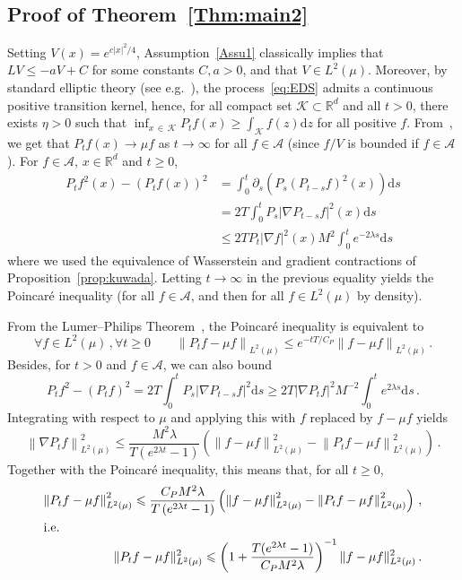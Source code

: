\documentclass[10pt]{amsart}
\theoremstyle{definition}\newtheorem{defi}[theo]{Definition}\newtheorem{rema}[theo]{Remark}\newtheorem{exam}[theo]{Example}\newtheorem{exem}[theo]{Example}\newtheorem{nota}[theo]{Notation}
\newcommand{\R}{\mathbb R}
\newcommand{\A}{\mathcal A}
\newcommand{\clK}{\mathcal K}
\newcommand{\dd}{\mathrm{d}}
\newcommand{\na}{\nabla}
\newcommand{\1}{\mathbbm{1}}
\newcommand{\nv}[1]{#1}
\let\oldforall\forall
\renewcommand*{\forall}{\mathrel{\oldforall}}
\begin{document}
\subsection{Proof of Theorem~\ref{Thm:main2}}\label{sec:preuveL2}
Setting $V(x) = e^{c|x|^2/4}$, Assumption~\ref{Assu1} classically implies that $LV\leqslant -aV + C$ for some constants $C,a>0$, and that $V\in L^2 (\mu)$. Moreover, by standard elliptic theory (see e.g.~\cite[Theorem~0.5 and Condition 0.24.A1]{DynkinVol2}), the process~\eqref{eq:EDS} admits a continuous positive transition kernel, hence, for all compact set $\clK\subset \R^d$ and all $t>0$, there exists $\eta>0$ such that $\inf_{x\,\in\,\clK} P_t f(x) \geqslant \int_{\clK} f(z)\dd z$ for all positive $f$. From~\cite{HairerMattingly2008}, we get that $P_t f(x) \rightarrow \mu f$ as $t\rightarrow \infty$ for all $f\in \A$ (since $f/V$ is bounded if $f\in\A$). For $f\in\A$, $x\in\R^d$ and $t\geqslant0$,
\begin{align*}
P_t f^2(x) - (P_t f(x))^2 & = \int_0^t \partial_s \left( P_s\left(P_{t-s} f\right)^2(x)\right) \dd s\\
& = 2 T \int_0^t P_s\left|\na P_{t-s} f\right|^2 (x)\dd s \\
& \leqslant 2T P_t|\na f|^2 (x) M^2 \int_0^t e^{-2\lambda s} \dd s
\end{align*}
where we used the equivalence of Wasserstein and gradient contractions \nv{of Proposition~\ref{prop:kuwada}}. Letting $t\rightarrow \infty$ in the previous equality yields the Poincaré inequality (for all $f\in\A$, and then for all $f\in L^2(\mu)$ by density).


From the Lumer--Philips Theorem~\cite[Chapter~IX, p.~250]{Yosida}, the Poincaré inequality is equivalent to
\[
\forall f\in L^2(\mu)\,, \forall t\geqslant 0\qquad \left\|P_tf -\mu f\right\|_{L^2(\mu)} \leqslant e^{-tT/C_P}\left\|f -\mu f\right\|_{L^2(\mu)} \,.
\]
Besides, for $t>0$ and $f\in\A$, we can also bound
\[
P_t f^2 - (P_t f)^2 = 2 T \int_0^t P_s\left|\na P_{t-s} f\right|^2 \dd s \geqslant 2 T \left|\na P_{t} f\right|^2 M^{-2}\int_0^t e^{2\lambda s} \dd s\,.
\]
Integrating with respect to $\mu$ and applying this with $f$ replaced by $f-\mu f$ yields
\[
\left\|\na P_t f\right\|_{L^2(\mu)}^2 \leqslant \frac{M^2\lambda}{T\left(e^{2\lambda t}-1\right)} \left( \left\|f-\mu f\right\|_{L^2(\mu)}^2- \left\|P_t f-\mu f\right\|_{L^2(\mu)}^2\right) \,.
\]
Together with the Poincaré inequality, this means that, for all $t\geqslant 0$,
\begin{align*}
\left\|P_t f - \mu f\right\|_{L^2(\mu)}^2 \leqslant \frac{C_PM^2\lambda}{T\left(e^{2\lambda t}-1\right)} \left( \left\|f-\mu f\right\|_{L^2(\mu)}^2- \left\|P_t f-\mu f\right\|_{L^2(\mu)}^2\right)\,,
\\
\intertext{i.e.}
\|P_t f - \mu f\|_{L^2(\mu)}^2 \leqslant \left( 1+ \nv{\frac{T(e^{2\lambda t}-1)}{C_PM^2\lambda }}\right)^{-1}\|f-\mu f\|_{L^2(\mu)}^2\,.
\end{align*}
\end{document}
